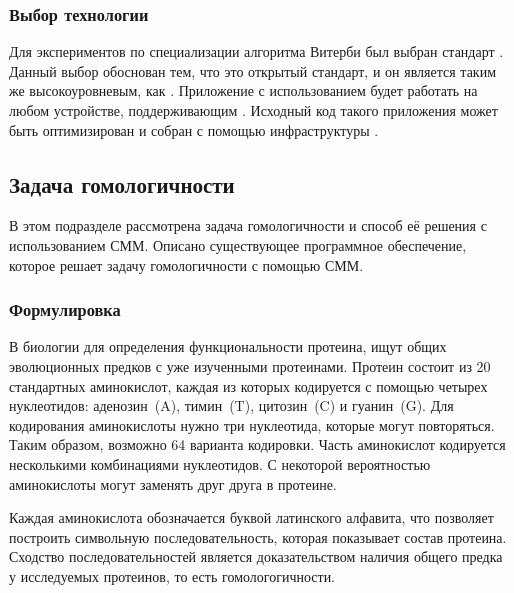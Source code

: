 \subsubsection{Выбор технологии}
Для экспериментов по специализации алгоритма Витерби был выбран стандарт 
.
Данный выбор обоснован тем, что это открытый стандарт, и он является таким же 
высокоуровневым, как .
Приложение с использованием  будет работать на любом устройстве, 
поддерживающим .
Исходный код такого приложения может быть оптимизирован и собран с помощью 
инфраструктуры .


\subsection{Задача гомологичности}
В этом подразделе рассмотрена задача гомологичности и способ её решения с 
использованием СММ.
Описано существующее программное обеспечение, которое решает задачу
гомологичности с помощью СММ.

\subsubsection{Формулировка}
В биологии для определения функциональности протеина, ищут общих эволюционных
предков с уже изученными протеинами.
Протеин состоит из 20 стандартных аминокислот, каждая из которых кодируется 
с помощью четырех нуклеотидов: аденозин~(A), тимин~(T), цитозин~(C) и 
гуанин~(G).
Для кодирования аминокислоты нужно три нуклеотида, которые могут повторяться.
Таким образом, возможно 64 варианта кодировки.
Часть аминокислот кодируется несколькими комбинациями нуклеотидов.
С некоторой вероятностью аминокислоты могут заменять друг друга в протеине.

Каждая аминокислота обозначается буквой латинского алфавита, что позволяет 
построить символьную последовательность, которая показывает состав протеина.
Сходство последовательностей является доказательством наличия общего предка у 
исследуемых протеинов, то есть гомологогичности.

